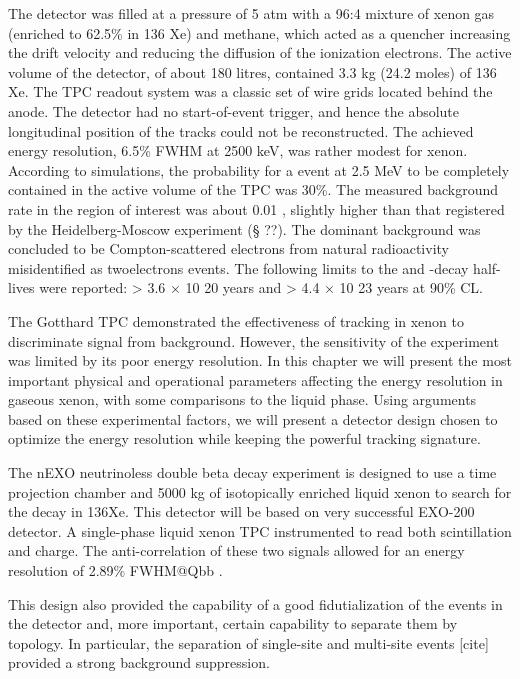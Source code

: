 The detector was ﬁlled at a pressure of 5 atm with a 96:4 mixture of xenon gas (enriched to 62.5\% in 136 Xe) and methane, which acted as a quencher increasing the drift velocity and reducing the diﬀusion of the ionization electrons. The active volume of the detector, of about 180 litres, contained 3.3 kg (24.2 moles) of 136 Xe. The TPC readout system was a classic set of wire grids located behind the anode. The detector had no start-of-event trigger, and hence the absolute longitudinal position of the tracks could not be reconstructed. The achieved energy resolution, 6.5\% FWHM at 2500 keV, was rather modest for xenon. According to simulations, the probability for a \bb event at 2.5 MeV to be completely contained in the active volume of the TPC was 30\%. The measured background rate in the region of interest was about 0.01 \ckkbby, slightly higher than that registered by the Heidelberg-Moscow experiment (§ ??). The dominant background was concluded to be Compton-scattered electrons from natural radioactivity misidentiﬁed as twoelectrons events. The following limits to the \bbtnu and \bbonu-decay half-lives were reported: \Ttnu > 3.6 × 10 20 years and \Tonu > 4.4 × 10 23 years at 90\% CL.

The Gotthard TPC demonstrated the eﬀectiveness of tracking in xenon to discriminate signal from background. However, the sensitivity of the experiment was limited by its poor energy resolution. In this chapter we will present the most important physical and operational parameters aﬀecting the energy resolution in gaseous xenon, with some comparisons to the liquid phase. Using arguments based on these experimental factors, we will present a detector design chosen to optimize the energy resolution while keeping the powerful tracking signature.




The nEXO neutrinoless double beta decay experiment is designed to use a time projection chamber and 5000 kg of isotopically enriched liquid xenon to search for the decay in 136Xe. This detector will be based on very successful EXO-200 detector. A single-phase liquid xenon TPC instrumented to read both scintillation and charge. The anti-correlation of these two signals allowed for an energy resolution of 2.89\% FWHM@Qbb \cite{EXO-200:2020wmu}.

This design also provided the capability of a good fidutialization of the events in the detector and, more important, certain capability to separate them by topology. In particular, the separation of single-site and multi-site events [cite] provided a strong background suppression.

